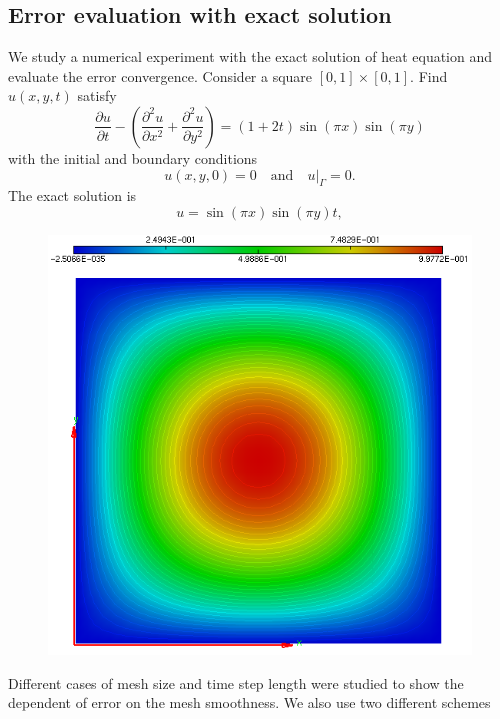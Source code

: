 \subsection{Error evaluation with exact solution}
We study a numerical experiment with the exact solution of heat equation and evaluate the error convergence. Consider a square $[0,1]\times[0,1]$. Find $u(x,y,t)$ satisfy
\begin{equation}
\dfrac{\partial u}{\partial t} - \left(\dfrac{\partial^2 u}{\partial x^2} + \dfrac{\partial^2u}{\partial y^2}\right) = (1+2t)\sin(\pi x) \sin(\pi y)
\end{equation}
with the initial and boundary conditions
$$
u(x,y,0) = 0 \quad \text{and} \quad u|_\Gamma = 0.
$$
The exact solution is
$$
u = \sin(\pi x) \sin(\pi y) t,
$$
\begin{figure}[h!]
	\centering
	\includegraphics[width=\linewidth]{direct}
\end{figure}
Different cases of mesh size and time step length were studied to show the dependent of error on the mesh smoothness. We also use two different schemes
